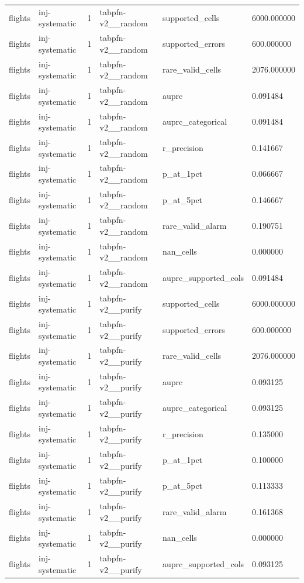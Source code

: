 \begin{tabular}{llllll}
flights & inj-systematic & 1 & tabpfn-v2\_\_random & supported\_cells & 6000.000000 \\
flights & inj-systematic & 1 & tabpfn-v2\_\_random & supported\_errors & 600.000000 \\
flights & inj-systematic & 1 & tabpfn-v2\_\_random & rare\_valid\_cells & 2076.000000 \\
flights & inj-systematic & 1 & tabpfn-v2\_\_random & auprc & 0.091484 \\
flights & inj-systematic & 1 & tabpfn-v2\_\_random & auprc\_categorical & 0.091484 \\
flights & inj-systematic & 1 & tabpfn-v2\_\_random & r\_precision & 0.141667 \\
flights & inj-systematic & 1 & tabpfn-v2\_\_random & p\_at\_1pct & 0.066667 \\
flights & inj-systematic & 1 & tabpfn-v2\_\_random & p\_at\_5pct & 0.146667 \\
flights & inj-systematic & 1 & tabpfn-v2\_\_random & rare\_valid\_alarm & 0.190751 \\
flights & inj-systematic & 1 & tabpfn-v2\_\_random & nan\_cells & 0.000000 \\
flights & inj-systematic & 1 & tabpfn-v2\_\_random & auprc\_supported\_cols & 0.091484 \\
flights & inj-systematic & 1 & tabpfn-v2\_\_purify & supported\_cells & 6000.000000 \\
flights & inj-systematic & 1 & tabpfn-v2\_\_purify & supported\_errors & 600.000000 \\
flights & inj-systematic & 1 & tabpfn-v2\_\_purify & rare\_valid\_cells & 2076.000000 \\
flights & inj-systematic & 1 & tabpfn-v2\_\_purify & auprc & 0.093125 \\
flights & inj-systematic & 1 & tabpfn-v2\_\_purify & auprc\_categorical & 0.093125 \\
flights & inj-systematic & 1 & tabpfn-v2\_\_purify & r\_precision & 0.135000 \\
flights & inj-systematic & 1 & tabpfn-v2\_\_purify & p\_at\_1pct & 0.100000 \\
flights & inj-systematic & 1 & tabpfn-v2\_\_purify & p\_at\_5pct & 0.113333 \\
flights & inj-systematic & 1 & tabpfn-v2\_\_purify & rare\_valid\_alarm & 0.161368 \\
flights & inj-systematic & 1 & tabpfn-v2\_\_purify & nan\_cells & 0.000000 \\
flights & inj-systematic & 1 & tabpfn-v2\_\_purify & auprc\_supported\_cols & 0.093125 \\

\end{tabular}
